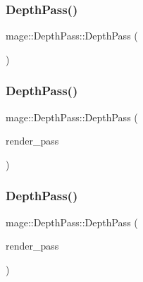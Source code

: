 \subsubsection{\texorpdfstring{Depth\+Pass()}{DepthPass()}\hspace{0.1cm}{\footnotesize\ttfamily [1/3]}}
{\footnotesize\ttfamily mage\+::\+Depth\+Pass\+::\+Depth\+Pass (\begin{DoxyParamCaption}{ }\end{DoxyParamCaption})}

\hypertarget{classmage_1_1_depth_pass_a9f0376b1423404dcced29535d59dd18c}{}\label{classmage_1_1_depth_pass_a9f0376b1423404dcced29535d59dd18c} 
\subsubsection{\texorpdfstring{Depth\+Pass()}{DepthPass()}\hspace{0.1cm}{\footnotesize\ttfamily [2/3]}}
{\footnotesize\ttfamily mage\+::\+Depth\+Pass\+::\+Depth\+Pass (\begin{DoxyParamCaption}\item[{const \hyperlink{classmage_1_1_depth_pass}{Depth\+Pass} \&}]{render\+\_\+pass }\end{DoxyParamCaption})\hspace{0.3cm}{\ttfamily [delete]}}

\hypertarget{classmage_1_1_depth_pass_af5755a8ee09bc528c0644f657558d71f}{}\label{classmage_1_1_depth_pass_af5755a8ee09bc528c0644f657558d71f} 
\subsubsection{\texorpdfstring{Depth\+Pass()}{DepthPass()}\hspace{0.1cm}{\footnotesize\ttfamily [3/3]}}
{\footnotesize\ttfamily mage\+::\+Depth\+Pass\+::\+Depth\+Pass (\begin{DoxyParamCaption}\item[{\hyperlink{classmage_1_1_depth_pass}{Depth\+Pass} \&\&}]{render\+\_\+pass }\end{DoxyParamCaption})\hspace{0.3cm}{\ttfamily [default]}}

